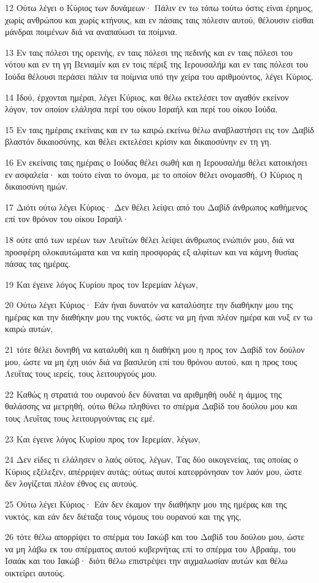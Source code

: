\par 12 Ούτω λέγει ο Κύριος των δυνάμεων· Πάλιν εν τω τόπω τούτω όστις είναι έρημος, χωρίς ανθρώπου και χωρίς κτήνους, και εν πάσαις ταις πόλεσιν αυτού, θέλουσιν είσθαι μάνδραι ποιμένων διά να αναπαύωσι τα ποίμνια.
\par 13 Εν ταις πόλεσι της ορεινής, εν ταις πόλεσι της πεδινής και εν ταις πόλεσι του νότου και εν τη γη Βενιαμίν και εν τοις πέριξ της Ιερουσαλήμ και εν ταις πόλεσι του Ιούδα θέλουσι περάσει πάλιν τα ποίμνια υπό την χείρα του αριθμούντος, λέγει Κύριος.
\par 14 Ιδού, έρχονται ημέραι, λέγει Κύριος, και θέλω εκτελέσει τον αγαθόν εκείνον λόγον, τον οποίον ελάλησα περί του οίκου Ισραήλ και περί του οίκου Ιούδα.
\par 15 Εν ταις ημέραις εκείναις και εν τω καιρώ εκείνω θέλω αναβλαστήσει εις τον Δαβίδ βλαστόν δικαιοσύνης, και θέλει εκτελέσει κρίσιν και δικαιοσύνην εν τη γη.
\par 16 Εν εκείναις ταις ημέραις ο Ιούδας θέλει σωθή και η Ιερουσαλήμ θέλει κατοικήσει εν ασφαλεία· και τούτο είναι το όνομα, με το οποίον θέλει ονομασθή, Ο Κύριος η δικαιοσύνη ημών.
\par 17 Διότι ούτω λέγει Κύριος· Δεν θέλει λείψει από του Δαβίδ άνθρωπος καθήμενος επί τον θρόνον του οίκου Ισραήλ·
\par 18 ούτε από των ιερέων των Λευϊτών θέλει λείψει άνθρωπος ενώπιόν μου, διά να προσφέρη ολοκαυτώματα και να καίη προσφοράς εξ αλφίτων και να κάμνη θυσίας πάσας τας ημέρας.
\par 19 Και έγεινε λόγος Κυρίου προς τον Ιερεμίαν λέγων,
\par 20 Ούτω λέγει Κύριος· Εάν ήναι δυνατόν να καταλύσητε την διαθήκην μου της ημέρας και την διαθήκην μου της νυκτός, ώστε να μη ήναι πλέον ημέρα και νυξ εν τω καιρώ αυτών,
\par 21 τότε θέλει δυνηθή να καταλυθή και η διαθήκη μου η προς τον Δαβίδ τον δούλον μου, ώστε να μη έχη υιόν διά να βασιλεύη επί του θρόνου αυτού, και η προς τους Λευΐτας τους ιερείς, τους λειτουργούς μου.
\par 22 Καθώς η στρατιά του ουρανού δεν δύναται να αριθμηθή ουδέ η άμμος της θαλάσσης να μετρηθή, ούτω θέλω πληθύνει το σπέρμα Δαβίδ του δούλου μου και τους Λευΐτας τους λειτουργούντας εις εμέ.
\par 23 Και έγεινε λόγος Κυρίου προς τον Ιερεμίαν, λέγων,
\par 24 Δεν είδες τι ελάλησεν ο λαός ούτος, λέγων, Τας δύο οικογενείας, τας οποίας ο Κύριος εξέλεξεν, απέρριψεν αυτάς; ούτως αυτοί κατεφρόνησαν τον λαόν μου, ώστε δεν λογίζεται πλέον έθνος εις αυτούς.
\par 25 Ούτω λέγει Κύριος· Εάν δεν έκαμον την διαθήκην μου της ημέρας και της νυκτός, και εάν δεν διέταξα τους νόμους του ουρανού και της γης,
\par 26 τότε θέλω απορρίψει το σπέρμα του Ιακώβ και του Δαβίδ του δούλου μου, ώστε να μη λάβω εκ του σπέρματος αυτού κυβερνήτας επί το σπέρμα του Αβραάμ, του Ισαάκ και του Ιακώβ· διότι θέλω επιστρέψει την αιχμαλωσίαν αυτών και θέλω οικτείρει αυτούς.

